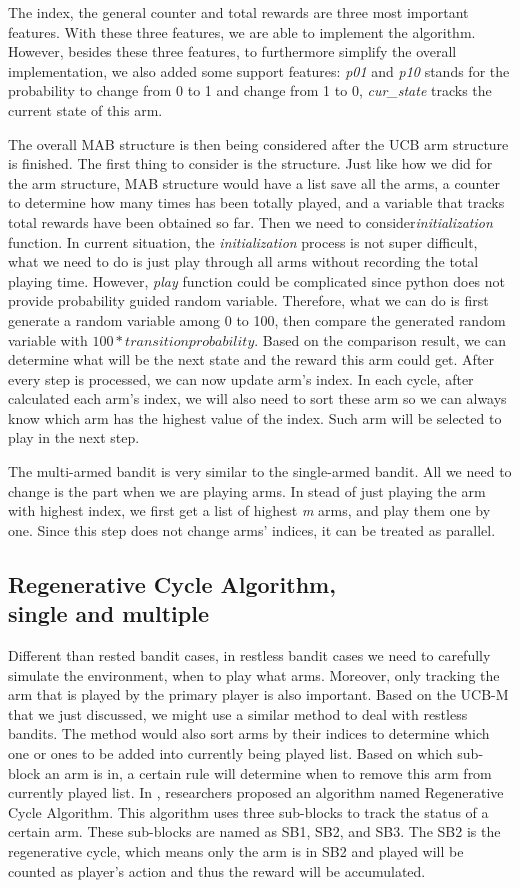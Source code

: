 \documentclass{article}
\begin{document}
The index, the general counter and total rewards are three most important features. With these three features, we are able to implement the algorithm. However, besides these three features, to furthermore simplify the overall implementation, we also added some support features: \textit{p01} and \textit{p10} stands for the probability to change from 0 to 1 and change from 1 to 0, \textit{cur\_state} tracks the current state of this arm.

The overall MAB structure is then being considered after the UCB arm structure is finished. The first thing to consider is the structure. Just like how we did for the arm structure, MAB structure would have a list save all the arms, a counter to determine how many times has been totally played, and a variable that tracks total rewards have been obtained so far. Then we need to consider\textit{initialization} function. In current situation, the \textit{initialization} process is not super difficult, what we need to do is just play through all arms without recording the total playing time. However, \textit{play} function could be complicated since python does not provide probability guided random variable. Therefore, what we can do is first generate a random variable among 0 to 100, then compare the generated random variable with $100 * transition probability$. Based on the comparison result, we can determine what will be the next state and the reward this arm could get. After every step is processed, we can now update arm's index. In each cycle, after calculated each arm's index, we will also need to sort these arm so we can always know which arm has the highest value of the index. Such arm will be selected to play in the next step.

The multi-armed bandit is very similar to the single-armed bandit. All we need to change is the part when we are playing arms. In stead of just playing the arm with highest index, we first get a list of highest \textit{m} arms, and play them one by one. Since this step does not change arms' indices, it can be treated as parallel. 

\subsection{Regenerative Cycle Algorithm,\\single and multiple}
Different than rested bandit cases, in restless bandit cases we need to carefully simulate the environment, when to play what arms. Moreover, only tracking the arm that is played by the primary player is also important. Based on the UCB-M that we just discussed, we might use a similar method to deal with restless bandits. The method would also sort arms by their indices to determine which one or ones to be added into currently being played list. Based on which sub-block an arm is in, a certain rule will determine when to remove this arm from currently played list. In \cite{rca}, researchers proposed an algorithm named Regenerative Cycle Algorithm. This algorithm uses three sub-blocks to track the status of a certain arm. These sub-blocks are named as SB1, SB2, and SB3. The SB2 is the regenerative cycle, which means only the arm is in SB2 and played will be counted as player's action and thus the reward will be accumulated.
\end{document}
